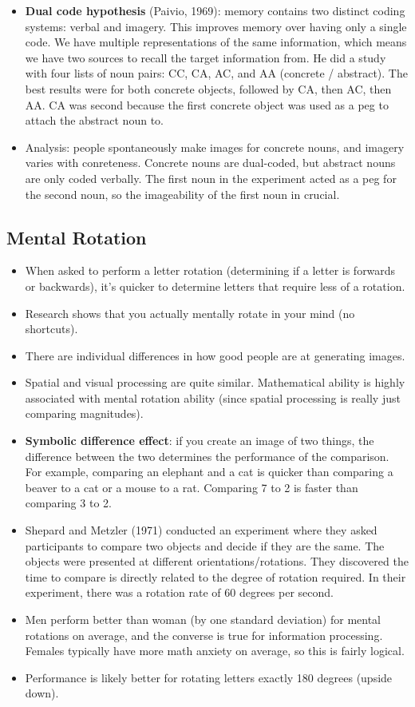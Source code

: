 \documentclass[]{article}
\begin{document}
\begin{itemize}
				\item \textbf{Dual code hypothesis} (Paivio, 1969): memory contains two distinct coding systems: verbal and imagery. This improves memory over having only a single code. We have multiple representations of the same information, which means we have two sources to recall the target information from. He did a study with four lists of noun pairs: CC, CA, AC, and AA (concrete / abstract). The best results were for both concrete objects, followed by CA, then AC, then AA. CA was second because the first concrete object was used as a peg to attach the abstract noun to.
				\item Analysis: people spontaneously make images for concrete nouns, and imagery varies with conreteness. Concrete nouns are dual-coded, but abstract nouns are only coded verbally. The first noun in the experiment acted as a peg for the second noun, so the imageability of the first noun in crucial.
			\end{itemize}

		\subsection{Mental Rotation}
			\begin{itemize}
				\item When asked to perform a letter rotation (determining if a letter is forwards or backwards), it's quicker to determine letters that require less of a rotation.
				\item Research shows that you actually mentally rotate in your mind (no shortcuts).
				\item There are individual differences in how good people are at generating images.
				\item Spatial and visual processing are quite similar. Mathematical ability is highly associated with mental rotation ability (since spatial processing is really just comparing magnitudes).
				\item \textbf{Symbolic difference effect}: if you create an image of two things, the difference between the two determines the performance of the comparison. For example, comparing an elephant and a cat is quicker than comparing a beaver to a cat or a mouse to a rat. Comparing 7 to 2 is faster than comparing 3 to 2.
				\item Shepard and Metzler (1971) conducted an experiment where they asked participants to compare two objects and decide if they are the same. The objects were presented at different orientations/rotations. They discovered the time to compare is directly related to the degree of rotation required. In their experiment, there was a rotation rate of 60 degrees per second.
				\item Men perform better than woman (by one standard deviation) for mental rotations on average, and the converse is true for information processing. Females typically have more math anxiety on average, so this is fairly logical. 
				\item Performance is likely better for rotating letters exactly 180 degrees (upside down).
			\end{itemize}
\end{document}
